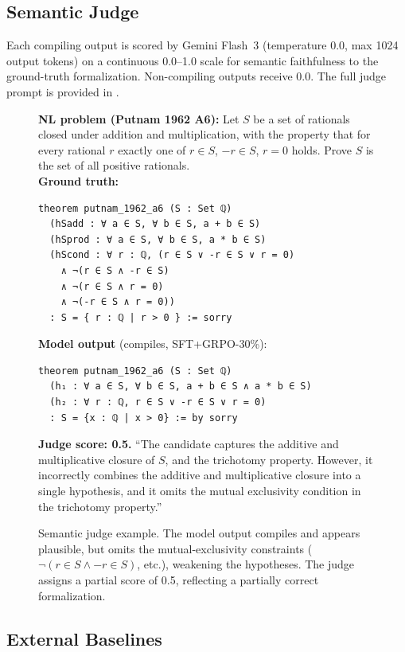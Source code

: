 \documentclass[11pt,a4paper]{article}
\begin{document}
\subsection{Semantic Judge}\label{sec:judge}

Each compiling output is scored by Gemini Flash~3 (temperature 0.0, max 1024 output tokens) on a continuous 0.0--1.0 scale for semantic faithfulness to the ground-truth formalization. Non-compiling outputs receive 0.0. The full judge prompt is provided in .

\begin{figure}[t]
\centering
\begin{mdframed}[backgroundcolor=codebg, linecolor=codeframe, linewidth=0.6pt, roundcorner=2pt]
{\small
\textbf{NL problem (Putnam 1962 A6):} Let $S$ be a set of rationals closed under addition and multiplication, with the property that for every rational $r$ exactly one of $r \in S$, $-r \in S$, $r=0$ holds. Prove $S$ is the set of all positive rationals.\\[4pt]
\textbf{Ground truth:}
\begin{lstlisting}
theorem putnam_1962_a6 (S : Set ℚ)
  (hSadd : ∀ a ∈ S, ∀ b ∈ S, a + b ∈ S)
  (hSprod : ∀ a ∈ S, ∀ b ∈ S, a * b ∈ S)
  (hScond : ∀ r : ℚ, (r ∈ S ∨ -r ∈ S ∨ r = 0)
    ∧ ¬(r ∈ S ∧ -r ∈ S)
    ∧ ¬(r ∈ S ∧ r = 0)
    ∧ ¬(-r ∈ S ∧ r = 0))
  : S = { r : ℚ | r > 0 } := sorry
\end{lstlisting}
\textbf{Model output} (compiles, SFT+GRPO-30\%):
\begin{lstlisting}
theorem putnam_1962_a6 (S : Set ℚ)
  (h₁ : ∀ a ∈ S, ∀ b ∈ S, a + b ∈ S ∧ a * b ∈ S)
  (h₂ : ∀ r : ℚ, r ∈ S ∨ -r ∈ S ∨ r = 0)
  : S = {x : ℚ | x > 0} := by sorry
\end{lstlisting}
\textbf{Judge score: 0.5.} ``The candidate captures the additive and multiplicative closure of $S$, and the trichotomy property. However, it incorrectly combines the additive and multiplicative closure into a single hypothesis, and it omits the mutual exclusivity condition in the trichotomy property.''
}
\end{mdframed}
\caption{Semantic judge example. The model output compiles and appears plausible, but omits the mutual-exclusivity constraints ($\neg(r \in S \wedge {-}r \in S)$, etc.), weakening the hypotheses. The judge assigns a partial score of 0.5, reflecting a partially correct formalization.}
\label{fig:judge_example}
\end{figure}

\subsection{External Baselines}\label{sec:baselines_def}
\end{document}
